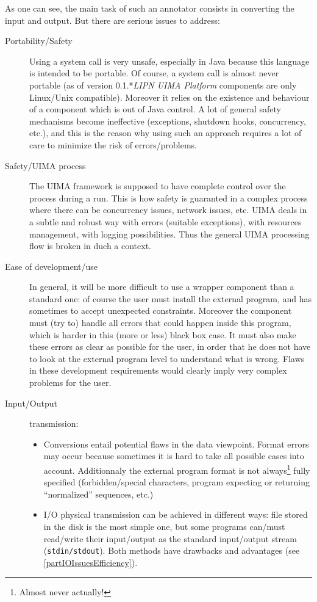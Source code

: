 \documentclass{article}
\newcommand{\softName}{{\em LIPN UIMA Platform}\xspace}
\newcommand{\versionSoft}{0.1.*}
\newenvironment{xitemize}{
\begin{itemize}
  \setlength{\itemsep}{.3\baselineskip}
  \setlength{\topsep}{0pt}
  \setlength{\parskip}{0pt}
  \setlength{\parsep}{0pt}
}{\end{itemize}}
\begin{document}
As one can see, the main task of such an annotator consists in converting the input and output. But there are serious issues to address:
\begin{description}
\item[Portability/Safety] Using a system call is very unsafe, especially in Java because this language is intended to be portable. Of course, a system call is almost never portable (as of version \versionSoft \softName components are only Linux/Unix compatible). Moreover it relies on the existence and behaviour of a component which is out of Java control. A lot of general safety mechanisms become ineffective (exceptions, shutdown hooks, concurrency, etc.), and this is the reason why using such an approach requires a lot of care to minimize the risk of errors/problems.
\item[Safety/UIMA process] The UIMA framework is supposed to have complete control over the process during a run. This is how safety is guaranted in a complex process where there can be concurrency issues, network issues, etc. UIMA deals in a subtle and robust way with errors (suitable exceptions), with resources management, with logging possibilities. Thus the general UIMA processing flow is broken in duch a context.
\item[Ease of development/use] In general, it will be more difficult to use a wrapper component than a standard one: of course the user must install the external program, and has sometimes to accept unexpected constraints. Moreover the component must (try to) handle all errors that could happen inside this program, which is harder in this (more or less) black box case. It must also make these errors as clear as possible for the user, in order that he does not have to look at the external program level to understand what is wrong. Flaws in these development requirements would clearly imply very complex problems for the user.
\item[Input/Output] transmission:
\begin{xitemize}
\item Conversions entail potential flaws in the data viewpoint. Format errors may occur because sometimes it is hard to take all  possible cases into account. Additionnaly the external program format is not always\footnote{Almost never actually!} fully specified (forbidden/special characters, program expecting or returning ``normalized'' sequences, etc.)
\item I/O physical transmission can be achieved in different ways: file stored in the disk is the most simple one, but some programs can/must read/write their input/output as the standard input/output stream ({\tt stdin/stdout}). Both methods have drawbacks and advantages (see \ref{partIOIssuesEfficiency}).

\end{xitemize}
\end{description}
\end{document}
